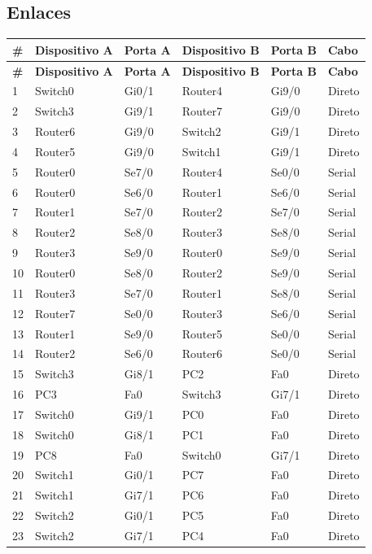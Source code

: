 \subsection{Enlaces}
\begingroup\scriptsize\setlength{\tabcolsep}{3pt}
\begin{longtable}{@{}p{}p{}p{}p{}p{}p{}@{}}
\toprule \textbf{\#} & \textbf{Dispositivo A} & \textbf{Porta A} & \textbf{Dispositivo B} & \textbf{Porta B} & \textbf{Cabo} \\\midrule\endfirsthead
\toprule \textbf{\#} & \textbf{Dispositivo A} & \textbf{Porta A} & \textbf{Dispositivo B} & \textbf{Porta B} & \textbf{Cabo} \\\midrule\endhead
1 & Switch0 & Gi0/1 & Router4 & Gi9/0 & Direto \\
2 & Switch3 & Gi9/1 & Router7 & Gi9/0 & Direto \\
3 & Router6 & Gi9/0 & Switch2 & Gi9/1 & Direto \\
4 & Router5 & Gi9/0 & Switch1 & Gi9/1 & Direto \\
5 & Router0 & Se7/0 & Router4 & Se0/0 & Serial \\
6 & Router0 & Se6/0 & Router1 & Se6/0 & Serial \\
7 & Router1 & Se7/0 & Router2 & Se7/0 & Serial \\
8 & Router2 & Se8/0 & Router3 & Se8/0 & Serial \\
9 & Router3 & Se9/0 & Router0 & Se9/0 & Serial \\
10 & Router0 & Se8/0 & Router2 & Se9/0 & Serial \\
11 & Router3 & Se7/0 & Router1 & Se8/0 & Serial \\
12 & Router7 & Se0/0 & Router3 & Se6/0 & Serial \\
13 & Router1 & Se9/0 & Router5 & Se0/0 & Serial \\
14 & Router2 & Se6/0 & Router6 & Se0/0 & Serial \\
15 & Switch3 & Gi8/1 & PC2 & Fa0 & Direto \\
16 & PC3 & Fa0 & Switch3 & Gi7/1 & Direto \\
17 & Switch0 & Gi9/1 & PC0 & Fa0 & Direto \\
18 & Switch0 & Gi8/1 & PC1 & Fa0 & Direto \\
19 & PC8 & Fa0 & Switch0 & Gi7/1 & Direto \\
20 & Switch1 & Gi0/1 & PC7 & Fa0 & Direto \\
21 & Switch1 & Gi7/1 & PC6 & Fa0 & Direto \\
22 & Switch2 & Gi0/1 & PC5 & Fa0 & Direto \\
23 & Switch2 & Gi7/1 & PC4 & Fa0 & Direto \\
\bottomrule
\end{longtable}\endgroup

